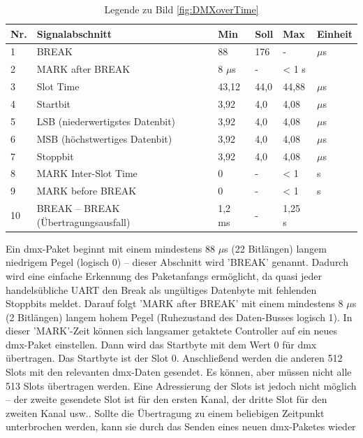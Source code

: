 \documentclass[11pt]{scrartcl}
\begin{document}
\vspace{-.7cm}
\begin{table}[H]
    \small
    \begin{tabularx}{\textwidth}{|l|X|l|l|l|l|}
        \hline Nr. & Signalabschnitt & Min & Soll & Max & Einheit\\\hline
        1 & BREAK & 88 & 176 & - & $\mu$s\\\hline
        2 & MARK after BREAK & 8 $\mu$s & - & < 1 s & \\\hline
        3 & Slot Time & 43,12 & 44,0 & 44,88 & $\mu$s\\\hline
        4 & Startbit & 3,92 & 4,0 & 4,08 & $\mu$s\\\hline
        5 & LSB (niederwertigstes Datenbit) & 3,92 & 4,0 & 4,08 & $\mu$s\\\hline
        6 & MSB (höchstwertiges Datenbit) & 3,92 & 4,0 & 4,08 & $\mu$s\\\hline
        7 & Stoppbit & 3,92 & 4,0 & 4,08 & $\mu$s\\\hline
        8 & MARK Inter-Slot Time & 0 & - & < 1 & s\\\hline
        9 & MARK before BREAK & 0 & - & < 1 & s\\\hline
        10 & BREAK – BREAK (Übertragungsausfall) & 1,2 ms & - & 1,25 s & \\\hline
    \end{tabularx}
    \caption{Legende zu Bild \ref{fig:DMXoverTime}}
\end{table}
\vspace{-.1cm}
\noindent
Ein \ac{dmx}-Paket beginnt mit einem mindestens 88 $\mu$s (22 Bitlängen) langem niedrigem Pegel (logisch 0)
– dieser Abschnitt wird 'BREAK' genannt. Dadurch wird eine einfache Erkennung des Paketanfangs
ermöglicht, da quasi jeder handelsübliche UART den Break als ungültiges Datenbyte mit fehlenden
Stoppbits meldet. Darauf folgt 'MARK after BREAK' mit einem mindestens 8 $\mu$s (2 Bitlängen) langem hohem Pegel
(Ruhezustand des Daten-Busses logisch 1). In dieser 'MARK'-Zeit können sich langsamer getaktete
Controller auf ein neues \ac{dmx}-Paket einstellen. Dann wird das Startbyte mit dem Wert 0 für \ac{dmx}
übertragen. Das Startbyte ist der Slot 0. Anschließend werden die anderen 512 Slots mit den
relevanten \ac{dmx}-Daten gesendet. Es können, aber müssen nicht alle 513 Slots übertragen werden.
Eine Adressierung der Slots ist jedoch nicht möglich – der zweite gesendete Slot ist für den ersten
Kanal, der dritte Slot für den zweiten Kanal usw.. Sollte die Übertragung zu einem beliebigen
Zeitpunkt unterbrochen werden, kann sie durch das Senden eines neuen \ac{dmx}-Paketes wieder
\end{document}
